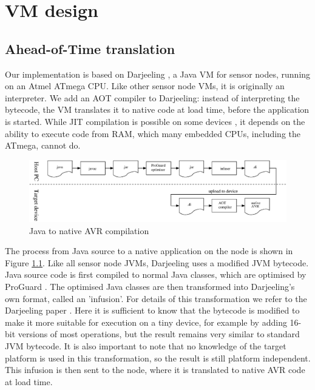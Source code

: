 \chapter{VM design}
\section{Ahead-of-Time translation}
\label{sec-aot-translation}
Our implementation is based on Darjeeling \cite{Brouwers:2009cj}, a Java VM for sensor nodes, running on an Atmel ATmega CPU. Like other sensor node VMs, it is originally an interpreter. We add an AOT compiler to Darjeeling: instead of interpreting the bytecode, the VM translates it to native code at load time, before the application is started. While JIT compilation is possible on some devices \cite{Ellul:2012thesis}, it depends on the ability to execute code from RAM, which many embedded CPUs, including the ATmega, cannot do.

\begin{figure}[]
  \includegraphics[width=\linewidth]{compilation-process.eps}
  \caption{Java to native AVR compilation}
  \label{fig-translation-process}
\end{figure}


The process from Java source to a native application on the node is shown in Figure \ref{fig-translation-process}. Like all sensor node JVMs, Darjeeling uses a modified JVM bytecode. Java source code is first compiled to normal Java classes, which are optimised by ProGuard \cite{proguard}. The optimised Java classes are then transformed into Darjeeling's own format, called an 'infusion'. For details of this transformation we refer to the Darjeeling paper \cite{Brouwers:2009cj}. Here it is sufficient to know that the bytecode is modified to make it more suitable for execution on a tiny device, for example by adding 16-bit versions of most operations, but the result remains very similar to standard JVM bytecode. It is also important to note that no knowledge of the target platform is used in this transformation, so the result is still platform independent. This infusion is then sent to the node, where it is translated to native AVR code at load time.


